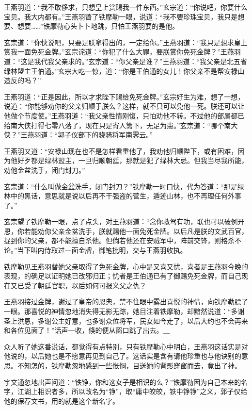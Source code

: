\documentclass[12pt,oneside]{book}
\begin{document}
王燕羽道：``我不敢侈求，只想皇上赏赐我一件东西。''玄宗道：``你说吧，你要什么宝贝。我大内都有。''王燕羽瞥了铁摩勒一眼，说道：``我不要珍珠宝贝，我只是想要、想要\ldots\ldots{}''铁摩勒心头卜卜地跳，只怕王燕羽要的是他。

玄宗道：``你快说吧，只要是朕拿得出的，一定给你。''王燕羽道：``我只是想求皇上赏我一面免死金牌。''玄宗诧道：``你犯了什么大罪，要朕赏你免死金牌？''王燕羽道：``这是我代我父亲求的。''玄宗道：``你父亲是谁？''王燕羽道：``我父亲是北五省绿林盟主王伯通。''玄宗大吃一惊，道：``你是王伯通的女儿！你父亲不是帮安禄山造反的吗？''

王燕羽道：``正是因此，所以才求陛下赐给免死金牌。''玄宗好生为难，想了一想，说道：``你能够劝你的父亲归顺于朕么？这样，就不只可以免他一死。朕还可以让他做个节度使。''王燕羽道：``我父亲性情刚愎，只怕劝他不转。不过他的部属都已给南大侠打得七零八落了，现在只是寄人篱下，无足为患。''玄宗道：``哪个南大侠？''王燕羽道：``郭子仪部下的骁骑将军南霁云。''

王燕羽又道：``安禄山现在也不是怎样看重他了，我劝他归顺陛下，或有困难，因为他好歹都是绿林盟主，一旦归顺朝廷，那就是犯了绿林大忌。但我当尽我所能，劝他金盆洗手，闭门封刀。''

玄宗道：``什么叫做金盆洗手，闭门封刀？''铁摩勒一时口快，代为答道：``那是绿林中的黑话，意思就是说以后再不干强盗的营生，遁迹山林，也不再理任何外事了。''

玄宗望了铁摩勒一眼，点了点头，对王燕羽道：``念你救驾有功，联也可以破例开恩，你若能劝你父亲金盆洗手，朕就赐他一面免死金牌。以后凡是朕的文武百官，捉到你的父亲，都不能擅自杀他。但倘若他还在安贼军中，阵前交锋，则格杀不论。''当下叫内侍取过一面金牌，御笔批明，交与王燕羽收执。

铁摩勒见王燕羽替她父亲取得了免死金牌，心中是又喜又忧，喜者是王燕羽今晚的表现，的确足以证明她已改邪归正；忧者是王伯通已有了御赐免死金牌，而自己现在又已受了朝廷官职，以后如何可报义父之仇？

王燕羽接过金牌，谢过了皇帝的恩典，禁不住眼中露出喜悦的神情，向铁摩勒膘了一眼。那喜悦的神情忽地消失得无影无踪，她目注着铁摩勒，却黯然说道：``多谢圣上洪恩，多谢公主好意，也多谢众位将军，民女如今走了，以后大约也不会再来和各位见面了！''话声一收，倏的便从窗口跳了出去。＿

众人听了她这番说话，都觉得有点特别，只有铁摩勒心中明白，王燕羽这话实是对他说的，以后她也是不愿意再见到自己了。这话实是含有请他珍重也与他诀别的意思。不知怎的，铁摩勒忽地感到一些怅恫，目送她的背影穿窗而去，竟出了神。

宇文通忽地出声问道：``铁铮，你和这女子是相识的么？''铁摩勒因为自己本来的名字，江湖上相识者多，所以改名为``铮''，取``庸中皎皎，铁中铮铮''之义，郭子仪给他的保荐文书，用的就是这个新名字。
\end{document}

